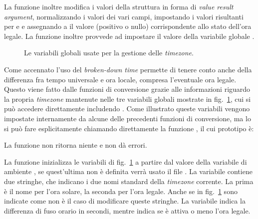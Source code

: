 La funzione inoltre modifica i valori della struttura  in forma di
\textit{value result argument}, normalizzando i valori dei vari campi,
impostando i valori risultanti per  e  e
assegnando a  il valore (positivo o nullo) corrispondente allo
stato dell'ora legale. La funzione inoltre provvede ad impostare il valore
della variabile globale .


\begin{figure}[!htb]
  \footnotesize
  \centering
  \begin{minipage}[c]{.75\textwidth}
  \end{minipage} 
  \normalsize 
  \caption{Le variabili globali usate per la gestione delle
    \textit{timezone}.}
  \label{fig:sys_tzname}
\end{figure}

Come accennato l'uso del \textit{broken-down time} permette di tenere conto
anche della differenza fra tempo universale e ora locale, compresa l'eventuale
ora legale.  Questo viene fatto dalle funzioni di conversione grazie alle
informazioni riguardo la propria \textit{timezone} mantenute nelle tre
variabili globali mostrate in fig.~\ref{fig:sys_tzname}, cui si può accedere
direttamente includendo . Come illustrato queste variabili
vengono impostate internamente da alcune delle precedenti funzioni di
conversione, ma lo si può fare esplicitamente chiamando direttamente la
funzione , il cui prototipo è:

\begin{funcproto}{
}

{La funzione non ritorna niente e non dà errori.}  
\end{funcproto}

La funzione inizializza le variabili di fig.~\ref{fig:sys_tzname} a partire
dal valore della variabile di ambiente , se quest'ultima non è
definita verrà usato il file . La variabile
 contiene due stringhe, che indicano i due nomi standard della
\textit{timezone} corrente. La prima è il nome per l'ora solare, la seconda
per l'ora legale. Anche se in fig.~\ref{fig:sys_tzname} sono indicate come
 non è il caso di modificare queste stringhe. La variabile
 indica la differenza di fuso orario in secondi, mentre
 indica se è attiva o meno l'ora legale.

